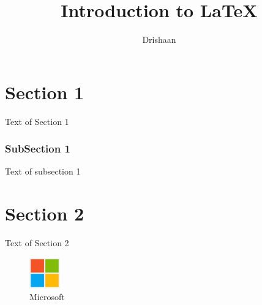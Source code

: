 \documentclass{report}
\begin{document}
    \title{Introduction to \LaTeX{}}
    \author{Drishaan}

    \maketitle

    \tableofcontents

    \chapter{Section 1}
	Text of Section 1
	\subsection{SubSection 1}
	Text of subsection 1
	\chapter{Section 2}
	Text of Section 2
    \begin{figure}[h]
        \includegraphics[width=50px]{microsoft_logo.png}
        \centering
        \caption{Microsoft}
    \end{figure}
\end{document}
